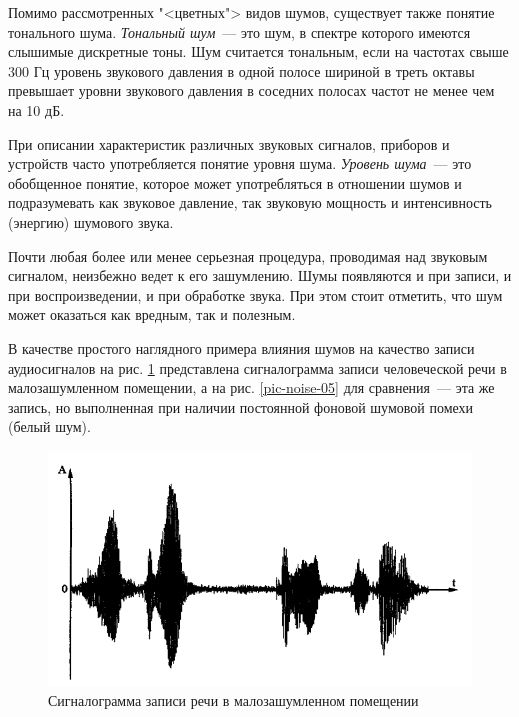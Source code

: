\documentclass[oneside, final, 14pt]{extreport}
\begin{document}
Помимо рассмотренных "<цветных"> видов шумов, существует также понятие тонального шума. {\itshape Тональный шум}~--- это шум, в спектре которого имеются слышимые дискретные тоны. Шум считается тональным, если на частотах свыше 300 Гц уровень звукового давления в одной полосе шириной в треть октавы превышает уровни звукового давления в соседних полосах частот не менее чем на 10 дБ.

При описании характеристик различных звуковых сигналов, приборов и устройств часто употребляется понятие уровня шума. {\itshape Уровень шума}~--- это обобщенное понятие, которое может употребляться в отношении шумов и подразумевать как звуковое давление, так звуковую мощность и интенсивность (энергию) шумового звука.

Почти любая более или менее серьезная процедура, проводимая над звуковым сигналом, неизбежно ведет к его зашумлению. Шумы появляются и при записи, и при воспроизведении, и при обработке звука. При этом стоит отметить, что шум может оказаться как вредным, так и полезным.

В качестве простого наглядного примера влияния шумов на качество записи
аудиосигналов на рис.  \ref{pic-noise-04} представлена сигналограмма записи человеческой речи в малозашумленном помещении, а на рис.  \ref{pic-noise-05} для сравнения~--- эта же запись, но выполненная при наличии постоянной фоновой шумовой помехи (белый шум).

\begin{figure}[h]
\centering
\includegraphics[scale=0.8]{pic-noise-04}
\caption{Сигналограмма записи речи в малозашумленном помещении}
\label{pic-noise-04}
\end{figure}
\end{document}
